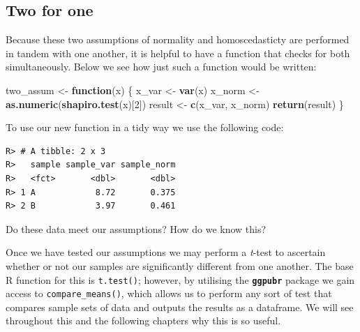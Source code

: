 \documentclass[english,10pt,a4paper,oneside]{book}
\newenvironment{Shaded}{\begin{snugshade}}{\end{snugshade}}
\newcommand{\KeywordTok}[1]{\textcolor[rgb]{0.13,0.29,0.53}{\textbf{#1}}}
\newcommand{\DataTypeTok}[1]{\textcolor[rgb]{0.13,0.29,0.53}{#1}}
\newcommand{\DecValTok}[1]{\textcolor[rgb]{0.00,0.00,0.81}{#1}}
\newcommand{\StringTok}[1]{\textcolor[rgb]{0.31,0.60,0.02}{#1}}
\newcommand{\ControlFlowTok}[1]{\textcolor[rgb]{0.13,0.29,0.53}{\textbf{#1}}}
\newcommand{\OperatorTok}[1]{\textcolor[rgb]{0.81,0.36,0.00}{\textbf{#1}}}
\newcommand{\NormalTok}[1]{#1}
\theoremstyle{definition}
\theoremstyle{definition}
\theoremstyle{definition}
\theoremstyle{remark}
\begin{document}
\subsection{Two for one}\label{two-for-one}

Because these two assumptions of normality and homoscedasticty are
performed in tandem with one another, it is helpful to have a function
that checks for both simultaneously. Below we see how just such a
function would be written:

\begin{Shaded}
\begin{Highlighting}[]
\NormalTok{two_assum <-}\StringTok{ }\ControlFlowTok{function}\NormalTok{(x) \{}
\NormalTok{  x_var <-}\StringTok{ }\KeywordTok{var}\NormalTok{(x)}
\NormalTok{  x_norm <-}\StringTok{ }\KeywordTok{as.numeric}\NormalTok{(}\KeywordTok{shapiro.test}\NormalTok{(x)[}\DecValTok{2}\NormalTok{])}
\NormalTok{  result <-}\StringTok{ }\KeywordTok{c}\NormalTok{(x_var, x_norm)}
  \KeywordTok{return}\NormalTok{(result)}
\NormalTok{\}}
\end{Highlighting}
\end{Shaded}

To use our new function in a tidy way we use the following code:

\begin{Shaded}
\end{Shaded}

\begin{verbatim}
R> # A tibble: 2 x 3
R>   sample sample_var sample_norm
R>   <fct>       <dbl>       <dbl>
R> 1 A            8.72       0.375
R> 2 B            3.97       0.461
\end{verbatim}

Do these data meet our assumptions? How do we know this?

Once we have tested our assumptions we may perform a \emph{t}-test to
ascertain whether or not our samples are significantly different from
one another. The base R function for this is \texttt{t.test()}; however,
by utilising the \textbf{\texttt{ggpubr}} package we gain access to
\texttt{compare\_means()}, which allows us to perform any sort of test
that compares sample sets of data and outputs the results as a
dataframe. We will see throughout this and the following chapters why
this is so useful.
\end{document}
